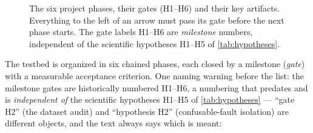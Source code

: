 \begin{figure}[htbp]
  \centering
  \caption{The six project phases, their gates (H1--H6) and their key artifacts. Everything to
  the left of an arrow must pass its gate before the next phase starts. The gate labels H1--H6
  are \emph{milestone} numbers, independent of the scientific hypotheses H1--H5 of
  \cref{tab:hypotheses}.}
  \label{fig:pipeline}
\end{figure}

The testbed is organized in six chained phases, each closed by a milestone (\emph{gate}) with a
measurable acceptance criterion. One naming warning before the list: the milestone gates are
historically numbered H1--H6, a numbering that predates and is \emph{independent of} the
scientific hypotheses H1--H5 of \cref{tab:hypotheses} --- ``gate H2'' (the dataset audit) and
``hypothesis H2'' (confusable-fault isolation) are different objects, and the text always says
which is meant:

